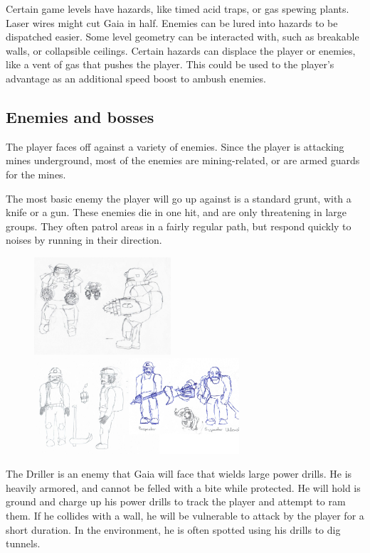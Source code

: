 \documentclass[12pt]{report}
\begin{document}
Certain game levels have hazards, like timed acid traps, or gas spewing plants. Laser wires
might cut Gaia in half. Enemies can be lured into hazards to be dispatched easier. Some 
level geometry can be interacted with, such as breakable walls, or collapsible ceilings.
Certain hazards can displace the player or enemies, like a vent of gas that pushes the 
player. This could be used to the player's advantage as an additional speed boost to ambush 
enemies.

\pagebreak
\subsection*{Enemies and bosses}
The player faces off against a variety of enemies. Since the player is attacking mines 
underground, most of the enemies are mining-related, or are armed guards for the mines.

The most basic enemy the player will go up against is a standard grunt, with a knife or a 
gun. These enemies die in one hit, and are only threatening in large groups. They often 
patrol areas in a fairly regular path, but respond quickly to noises by running in their
direction.

\begin{figure}[ht]
    \centering
    \includegraphics[width=2in]{img/driller.jpeg.jpeg}
    \includegraphics[width=3in]{img/prospector.jpeg}
\end{figure}

The Driller is an enemy that Gaia will face that wields large power drills. He is heavily
armored, and cannot be felled with a bite while protected. He will hold is ground and charge
up his power drills to track the player and attempt to ram them. If he collides with a wall,
he will be vulnerable to attack by the player for a short duration. In the environment, he is 
often spotted using his drills to dig tunnels.
\end{document}
